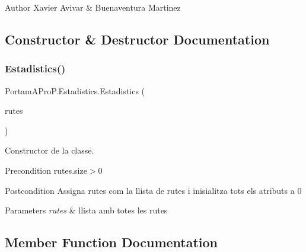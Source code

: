 \begin{DoxyAuthor}{Author}
Xavier Avivar \& Buenaventura Martinez 
\end{DoxyAuthor}


\subsection{Constructor \& Destructor Documentation}
\mbox{\label{class_portam_a_pro_p_1_1_estadistics_a94e45c99d004023042769c71eed2fd1e}} 
\subsubsection{\texorpdfstring{Estadistics()}{Estadistics()}}
{\footnotesize\ttfamily Portam\+A\+Pro\+P.\+Estadistics.\+Estadistics (\begin{DoxyParamCaption}\item[{Array\+List$<$ \hyperlink{class_portam_a_pro_p_1_1_ruta}{Ruta} $>$}]{rutes }\end{DoxyParamCaption})}



Constructor de la classe. 

\begin{DoxyPrecond}{Precondition}
rutes.\+size$>$0 
\end{DoxyPrecond}
\begin{DoxyPostcond}{Postcondition}
Assigna rutes com la llista de rutes i inisialitza tots els atributs a 0 
\end{DoxyPostcond}

\begin{DoxyParams}{Parameters}
{\em rutes} & llista amb totes les rutes \\
\hline
\end{DoxyParams}


\subsection{Member Function Documentation}
\mbox{\label{class_portam_a_pro_p_1_1_estadistics_a36584b822106277dc698bc3bfb5baf0b}} 
